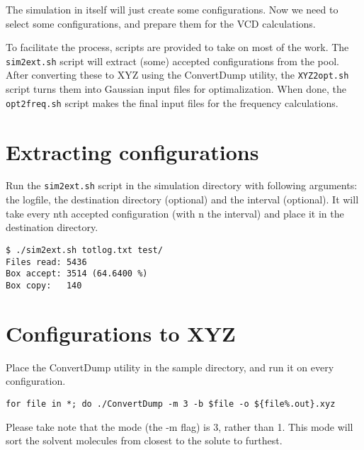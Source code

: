
The simulation in itself will just create some configurations. Now we need to 
select some configurations, and prepare them for the VCD calculations.

To facilitate the process, scripts are provided to take on most of the work. 
The \verb|sim2ext.sh| script will extract (some) accepted configurations from 
the 
pool. After converting these to XYZ using the ConvertDump utility, the 
\verb|XYZ2opt.sh| script turns them into Gaussian input files for 
optimalization. When done, the \verb|opt2freq.sh| script makes the final input 
files for the frequency calculations.

\section{Extracting configurations}

Run the \verb|sim2ext.sh| script in the simulation directory with following 
arguments: the logfile, the destination directory (optional) and the interval 
(optional). It will take every nth accepted configuration (with n the interval)
and place it in the destination directory.

\begin{lstlisting}[caption=The sim2ext script]
$ ./sim2ext.sh totlog.txt test/
Files read: 5436
Box accept: 3514 (64.6400 %)
Box copy:   140
\end{lstlisting}

\section{Configurations to XYZ}

Place the ConvertDump utility in the sample directory, and run it on every 
configuration.

\begin{lstlisting}[caption=Using the ConvertDump utility to make XYZ's]
for file in *; do ./ConvertDump -m 3 -b $file -o ${file%.out}.xyz
\end{lstlisting}

Please take note that the mode (the -m flag) is 3, rather than 1. This mode 
will sort the solvent molecules from closest to the solute to furthest.